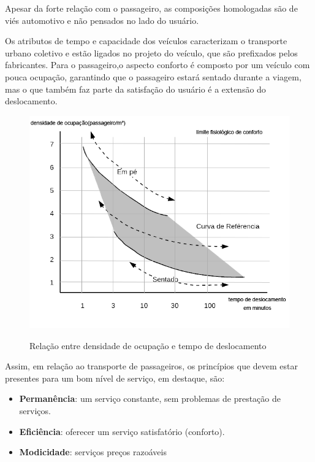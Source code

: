 

Apesar da forte relação com o passageiro, as composições homologadas são de viés automotivo e não pensados no lado do usuário.
 
Os atributos de tempo e capacidade dos veículos caracterizam o transporte urbano coletivo e estão ligados no projeto do veículo, que são prefixados pelos fabricantes. Para o passageiro,o aspecto conforto é composto por um veículo com pouca ocupação, garantindo que o passageiro estará sentado durante a viagem, mas o que também faz parte da satisfação do usuário é a extensão do deslocamento.

\begin{figure}[H]
  \centering
  \caption{Relação entre densidade de ocupação e tempo de deslocamento}
 \includegraphics[scale=0.55]{imagens/limite-fisiologico.png} \par
\bigskip
\cite[p. 307]{MARTINS}
\end{figure}
Assim, em relação ao transporte de passageiros, os princípios que devem estar presentes para um bom nível de serviço, em destaque, são: 
\begin{itemize}
    \item \textbf{Permanência}: um serviço constante, sem problemas de prestação de serviços.
    \item \textbf{Eficiência}: oferecer um serviço satisfatório (conforto).
    \item \textbf{Modicidade}: serviços preços razoáveis
\end{itemize}


